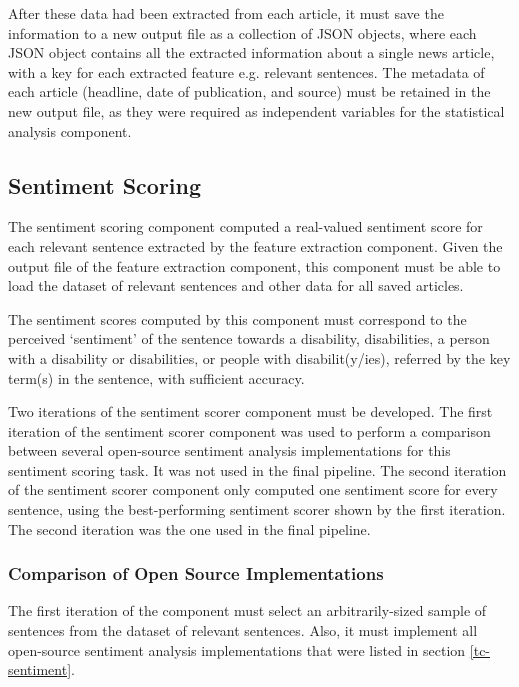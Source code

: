 \documentclass{report}
\begin{document}
After these data had been extracted from each article, it must save the information to a new output file as a collection of JSON objects, where each JSON object contains all the extracted information about a single news article, with a key for each extracted feature e.g. relevant sentences.
The metadata of each article (headline, date of publication, and source) must be retained in the new output file, as they were required as independent variables for the statistical analysis component.

\subsection{Sentiment Scoring} \label{req-sentiment}

The sentiment scoring component computed a real-valued sentiment score for each relevant sentence extracted by the feature extraction component.
Given the output file of the feature extraction component, this component must be able to load the dataset of relevant sentences and other data for all saved articles.

The sentiment scores computed by this component must correspond to the perceived `sentiment' of the sentence towards a disability, disabilities, a person with a disability or disabilities, or people with disabilit(y/ies), referred by the key term(s) in the sentence, with sufficient accuracy.

Two iterations of the sentiment scorer component must be developed.
The first iteration of the sentiment scorer component was used to perform a comparison between several open-source sentiment analysis implementations for this sentiment scoring task.
It was not used in the final pipeline.
The second iteration of the sentiment scorer component only computed one sentiment score for every sentence, using the best-performing sentiment scorer shown by the first iteration.
The second iteration was the one used in the final pipeline.

\subsubsection{Comparison of Open Source Implementations} \label{req-sentiment-comparison}

The first iteration of the component must select an arbitrarily-sized sample of sentences from the dataset of relevant sentences.
Also, it must implement all open-source sentiment analysis implementations that were listed in section \ref{tc-sentiment}.
\end{document}
